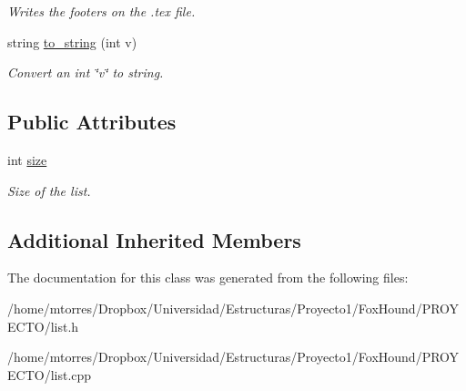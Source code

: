 \begin{DoxyCompactItemize}
\begin{DoxyCompactList}\small\item\em Writes the footers on the .tex file. \end{DoxyCompactList}\item 
\hypertarget{classlist_af38e18a21e1631f6f0e381aefe4262fe}{string \hyperlink{classlist_af38e18a21e1631f6f0e381aefe4262fe}{to\-\_\-string} (int v)}\label{classlist_af38e18a21e1631f6f0e381aefe4262fe}

\begin{DoxyCompactList}\small\item\em Convert an int \char`\"{}v\char`\"{} to string. \end{DoxyCompactList}\end{DoxyCompactItemize}
\subsection*{Public Attributes}
\begin{DoxyCompactItemize}
\item 
\hypertarget{classlist_a3b03adad0c0429bae9493667ff366dc2}{int \hyperlink{classlist_a3b03adad0c0429bae9493667ff366dc2}{size}}\label{classlist_a3b03adad0c0429bae9493667ff366dc2}

\begin{DoxyCompactList}\small\item\em Size of the list. \end{DoxyCompactList}\end{DoxyCompactItemize}
\subsection*{Additional Inherited Members}


The documentation for this class was generated from the following files\-:\begin{DoxyCompactItemize}
\item 
/home/mtorres/\-Dropbox/\-Universidad/\-Estructuras/\-Proyecto1/\-Fox\-Hound/\-P\-R\-O\-Y\-E\-C\-T\-O/list.\-h\item 
/home/mtorres/\-Dropbox/\-Universidad/\-Estructuras/\-Proyecto1/\-Fox\-Hound/\-P\-R\-O\-Y\-E\-C\-T\-O/list.\-cpp\end{DoxyCompactItemize}
